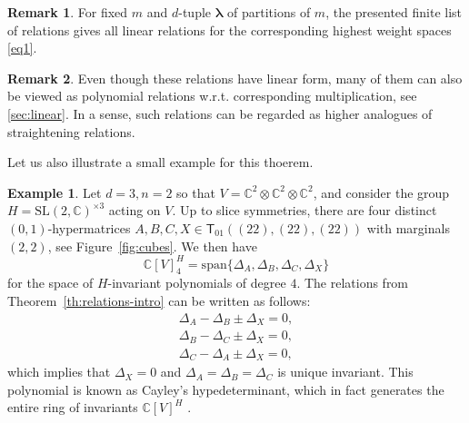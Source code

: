 \documentclass[12pt, reqno]{amsart}
\theoremstyle{definition}
\newtheorem{example}{Example}[section]
\newtheorem{remark}{Remark}[section]
\newcommand{\dett}{\mathrm{det}}
\begin{document}
\begin{remark}
For fixed $m$ and $d$-tuple $\pmb{\lambda}$ of partitions of $m$, the presented finite list of relations gives all linear relations for the corresponding highest weight spaces \eqref{eq1}. 
\end{remark}

\begin{remark}
Even though these relations have linear form, many of them can also be viewed as polynomial relations w.r.t. corresponding multiplication, see \textsection\,\ref{sec:linear}. In a sense, such relations can be regarded as higher analogues of straightening relations. 
\end{remark}




Let us also illustrate a small example for this thoerem.

\begin{example}%
\label{ex:2x2x2}
    Let $d = 3, n = 2$ so that $V = \mathbb{C}^2 \otimes \mathbb{C}^2 \otimes \mathbb{C}^2$, and consider the group $H = \mathrm{SL}(2, \mathbb{C})^{\times 3}$ acting on $V$.  
    Up to slice symmetries, there are four distinct $(0,1)$-hypermatrices $A,B,C,X \in \mathsf{T}_{01}((22),(22),(22))$ with marginals $(2,2)$, see Figure~\ref{fig:cubes}. We then have $$\mathbb{C}[V]^H_4 = \mathrm{span}\{\Delta_A, \Delta_B, \Delta_C, \Delta_X\}$$ 
    for the space of $H$-invariant polynomials of degree $4$.  
    The relations from Theorem~\ref{th:relations-intro} can be written as follows:
    \begin{align*}
        \Delta_A - \Delta_B \pm \Delta_X = 0,\\
        \Delta_B - \Delta_C \pm \Delta_X = 0,\\
        \Delta_C - \Delta_A \pm \Delta_X = 0,
    \end{align*}
    which implies that $\Delta_X = 0$ and $\Delta_A = \Delta_B = \Delta_C$ is unique invariant. This polynomial is known as Cayley's hypedeterminant, %
    which in fact generates the entire ring of invariants $\mathbb{C}[V]^H$ \cite{bbs12}.
\end{example}
\end{document}
